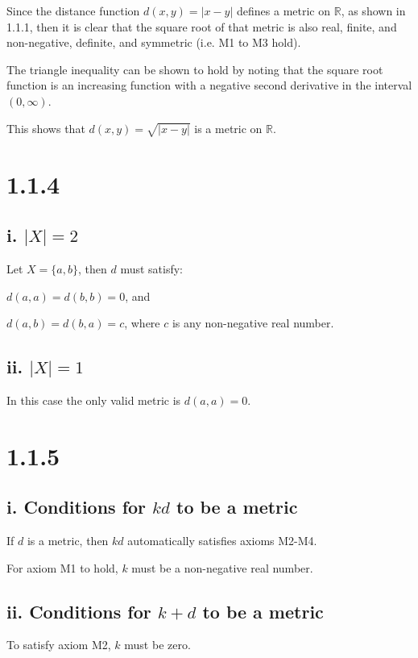 \documentclass{article}
\begin{document}
Since the distance function $d(x,y) = |x-y|$ defines a metric on $\mathbb{R}$, as shown in 1.1.1, then it is clear that the square root of that metric is also real, finite, and non-negative, definite, and symmetric (i.e. M1 to M3 hold).
\newline

\noindent
The triangle inequality can be shown to hold by noting that the square root function is an increasing function with a negative second derivative in the interval $(0, \infty)$.
\newline

\noindent
This shows that $d(x,y) = \sqrt{|x-y|}$ is a metric on $\mathbb{R}$.


\section*{1.1.4}

\subsection*{i. $|X| = 2$}
Let $X = \{a,b\}$, then $d$ must satisfy:
\newline

$d(a,a) = d(b,b) = 0$, and


$d(a,b) = d(b,a) = c$, where $c$ is any non-negative real number.

\subsection*{ii. $|X| = 1$}
In this case the only valid metric is $d(a,a) = 0$.


\section*{1.1.5}
\subsection*{i. Conditions for $kd$ to be a metric}
If $d$ is a metric, then $kd$ automatically satisfies axioms M2-M4.
\newline

\noindent
For axiom M1 to hold, $k$ must be a non-negative real number.

\subsection*{ii. Conditions for $k+d$ to be a metric}
To satisfy axiom M2, $k$ must be zero.
\end{document}
